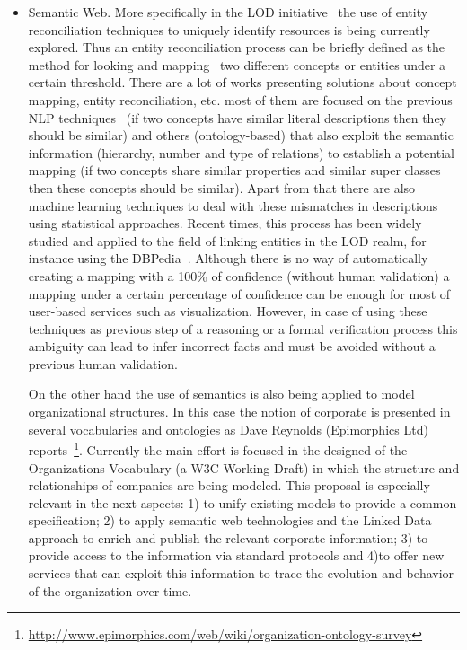 \documentclass{llncs}
\begin{document}
\begin{itemize}
 \item Semantic Web. More specifically in the LOD initiative~\cite{Berners-Lee-2006} the use of entity reconciliation techniques to uniquely identify resources 
 is being currently explored. Thus an entity reconciliation process can be briefly defined as the method for looking and mapping~\cite{DBLP:conf/semweb/IseleJB10,DBLP:conf/icwe/IseleJB12} two different 
 concepts or entities under a certain threshold. There are a lot of  works presenting solutions about concept mapping, entity reconciliation, etc. 
 most of them are focused on the previous NLP techniques~\cite{conf/www/MaaliCP11,Serimi} (if two concepts have similar literal descriptions then they should be similar) 
 and others (ontology-based) that also exploit the semantic information (hierarchy, number and type of relations) to establish a potential mapping 
 (if two concepts share similar properties and similar super classes then these concepts should be similar). Apart from that 
 there are also machine learning techniques to deal with these mismatches in descriptions using statistical approaches. Recent times, 
 this process has been widely studied and applied to the field of linking entities in the LOD realm, for instance using the DBPedia~\cite{Mendes:2011:DSS:2063518.2063519}. 
 Although there is no way of automatically creating a mapping with a 100\% of confidence (without human validation) a mapping under a certain percentage of confidence can be 
 enough for most of user-based services such as visualization. However, in case of using these techniques as previous step of a reasoning or 
 a formal verification process this ambiguity can lead to infer incorrect facts and must be avoided without a previous human validation. 

 On the other hand the use of semantics is also being applied to model organizational structures. In this case the notion 
 of corporate is presented in several vocabularies and ontologies as Dave Reynolds (Epimorphics Ltd) reports~\footnote{\url{http://www.epimorphics.com/web/wiki/organization-ontology-survey}}. 
 Currently the main effort is focused in the designed of the Organizations Vocabulary (a W3C Working Draft) in which the structure and 
 relationships of companies are being modeled. This proposal is especially relevant in the next aspects:  
 1) to unify existing models to provide a common specification; 2) to apply semantic web technologies and the Linked Data approach to enrich 
 and publish the relevant corporate information; 3) to provide access to the information via standard protocols 
 and 4)to  offer new services that can exploit this information to trace the evolution and behavior of the organization over time.


\end{itemize}
\end{document}

